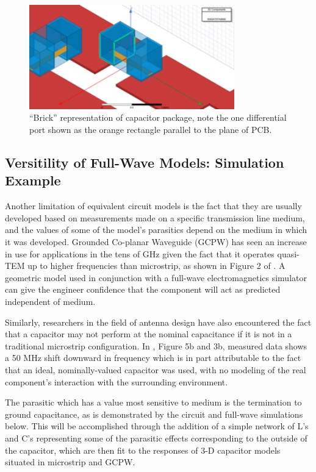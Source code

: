 \documentclass[12pt]{usfcoe}
\begin{document}
    \begin{figure}[H]
        \begin{center}
        \includegraphics[width=3.5in]{images/brick_model.png}
        \caption{``Brick'' representation of capacitor package, note the one differential port shown as the orange rectangle parallel to the plane of PCB.} 
        \label{fig:brick_model}
        \end{center}
    \end{figure}
    
    \subsection{Versitility of Full-Wave Models: Simulation Example}
    Another limitation of equivalent circuit models is the fact that
    they are usually developed based on measurements made on a specific transmission line medium, and the values of some of the model's parasitics depend on the medium in which it was developed.
    Grounded Co-planar Waveguide (GCPW) has seen an increase in use for applications in the tens of GHz given the fact that it operates quasi-TEM up to higher frequencies than microstrip, as shown in Figure 2 of \cite{coonrod2012comparing}. 
    A geometric model used in conjunction
    with a full-wave electromagnetics simulator can give the engineer
    confidence that the component will act as predicted independent of medium.
    
     Similarly, researchers in the field of antenna design have also
    encountered the fact that a capacitor may not perform at the nominal
    capacitance if it is not in a traditional microstrip configuration. In
    \cite{mumcuCapacitors}, Figure 5b and 3b, measured data shows a 50 MHz shift
    downward in frequency which is in part attributable to the fact that
    an ideal, nominally-valued capacitor was used, with no modeling of the
    real component's interaction with the surrounding environment.
    
    The parasitic which has a value most sensitive to medium is the
    termination to ground capacitance, as is demonstrated by the circuit
    and full-wave simulations below.
    This will be accomplished through the addition of a simple network of L's and C's representing some of the parasitic effects corresponding to the outside of the capacitor, which are then fit to the responses of 3-D capacitor models situated in microstrip and GCPW.
    
\end{document}
